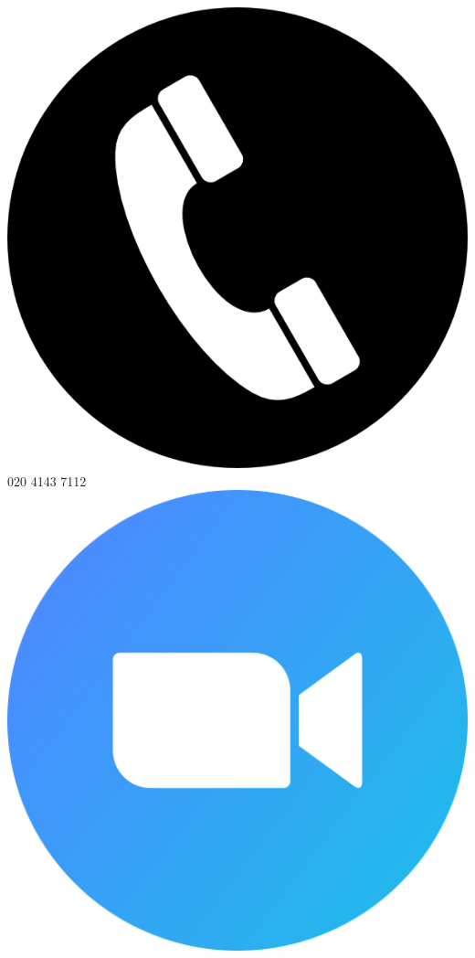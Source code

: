 \begin{center}
    \hspace*{5mm}
    \includegraphics[scale=0.3]{figs/phone.png}
    020 4143 7112
    \hspace*{5mm}
    \includegraphics[scale=0.036]{figs/zoom.png}

\end{center}
